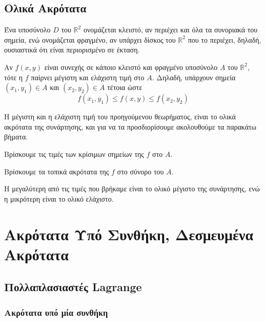 \section{Ολικά Ακρότατα}

Ένα υποσύνολο $D$ του $ \mathbb{R}^{2} $ ονομάζεται κλειστό, αν περιέχει και όλα 
τα συνοριακά του σημεία, ενώ ονομάζεται φραγμένο, αν υπάρχει δίσκος του 
$ \mathbb{R}^{2} $ που το περιέχει, δηλαδή, ουσιαστικά ότι είναι περιορισμένο σε έκταση.

\begin{thm}
    Αν $f(x,y)$ είναι συνεχής σε κάποιο κλειστό και φραγμένο υποσύνολο $A$ του $
    \mathbb{R}^{2} $, τότε η $f$ παίρνει μέγιστη και ελάχιστη τιμή στο $A$. Δηλαδή, 
    υπάρχουν σημεία $ (x_{1}, y_{1}) \in A $ και $ (x_{2}, y_{2}) \in A $ τέτοια ώστε 
    \[
        f(x_{1}, y_{1}) \leq f(x,y) \leq f(x_{2}, y_{2})
    \]
\end{thm}

Η μέγιστη και η ελάχιστη τιμή του προηγούμενου θεωρήματος, είναι το ολικά ακρότατα 
της συνάρτησης, και για να τα προσδιορίσουμε ακολουθούμε τα παρακάτω βήματα.

\begin{myitemize}
    \item Βρίσκουμε τις τιμές των κρίσιμων σημείων της $f$ στο $A$.
    \item Βρίσκουμε τα τοπικά ακρότατα της $f$ στο σύνορο του $A$. 
    \item Η μεγαλύτερη από τις τιμές που βρήκαμε είναι το ολικό μέγιστο της 
        συνάρτησης, ενώ η μικρότερη είναι το ολικό ελάχιστο.
\end{myitemize}




\chapter{Ακρότατα Υπό Συνθήκη, Δεσμευμένα Ακρότατα}

\section{Πολλαπλασιαστές Lagrange}

\subsection{Ακρότατα υπό μία συνθήκη}

